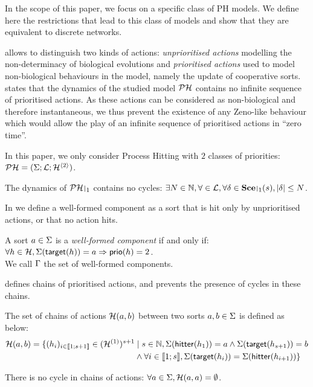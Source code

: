 In the scope of this paper, we focus on a specific class of PH models.
We define here the restrictions that lead to this class of models and show that they are equivalent to discrete networks.

 allows to distinguish two kinds of actions:
\emph{unprioritised actions} modelling the non-determinacy of biological evolutions
and \emph{prioritised actions} used to model non-biological behaviours in the model, namely the update of cooperative sorts.
 states that the dynamics of the studied model $\mathcal{PH}$ contains no infinite sequence of prioritised actions.
As these actions can be considered as non-biological and therefore instantaneous, we thus prevent the existence of any Zeno-like behaviour
which would allow the play of an infinite sequence of prioritised actions in “zero time”.
\begin{criterion}
\label{cr:2prio}
  In this paper, we only consider Process Hitting with $2$ classes of priorities:
  $\mathcal{PH} = (\Sigma; \mathcal{L}; \mathcal{H}^{\langle 2 \rangle})$.
\end{criterion}
%
\begin{criterion}
\label{cr:bounded}
  The dynamics of $\restriction{\PH}{1}$ contains no cycles:
  $\exists N \in \sN, \forall \in \PHl, \forall \delta \in \restriction{\Sce}{1}(s), |\delta| \leq N$.
\end{criterion}

In  we define a well-formed component as a sort that is hit only by unprioritised actions, or that no action hits.
\begin{definition}
\label{def:component}
  A sort $a \in \Sigma$ is a \emph{well-formed component} if and only if:
  $\forall h \in \mathcal{H}, \Sigma(\mathsf{target}(h)) = a \Rightarrow \mathsf{prio}(h) = 2$.\\
  We call $\Gamma$ the set of well-formed components.
\end{definition}

 defines chains of prioritised actions,
and  prevents the presence of cycles in these chains.
\begin{definition}
\label{def:chainsactions}
  The set of chains of actions $\mathcal{H}(a, b)$ between two sorts $a, b \in \Sigma$ is defined as below:
  \begin{align*}
  \mathcal{H}(a, b) = \{ (h_i)_{i \in \llbracket 1; s+1 \rrbracket} \in (\mathcal{H}^{(1)})^{s+1} &\mid s \in \mathbb{N}, \Sigma(\mathsf{hitter}(h_1)) = a \wedge \Sigma(\mathsf{target}(h_{s+1})) = b \\
    & \wedge \forall i \in \llbracket 1; s \rrbracket, \Sigma(\mathsf{target}(h_{i})) = \Sigma(\mathsf{hitter}(h_{i+1})) \}
  \end{align*}
\end{definition}
\begin{criterion}
\label{cr:cyclefreeness}
  There is no cycle in chains of actions:
  $\forall a \in \Sigma, \mathcal{H}(a, a) = \emptyset$.
\end{criterion}

